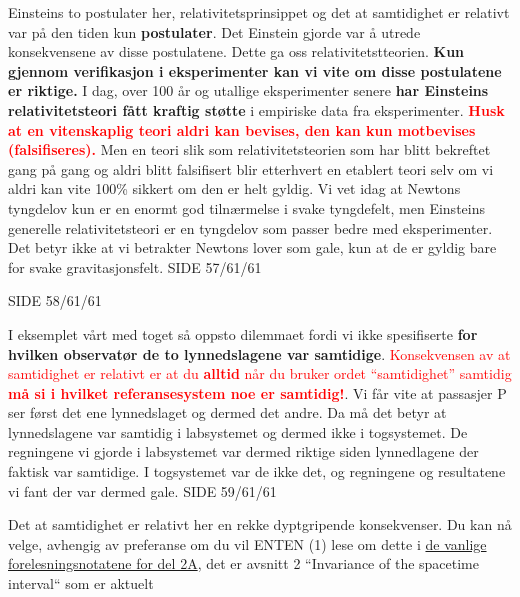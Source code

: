 \documentclass{beamer}
\let\hrefori\href
\renewcommand{\href}[2]{{\setlength{\fboxsep}{1pt}\colorbox{sunset}{\hrefori{#1}{#2}}}}
\begin{document}
\begin{frame}
{
  \large
Einsteins to postulater her, relativitetsprinsippet og det at samtidighet er relativt var på den tiden kun {\bf postulater}. Det Einstein gjorde var å utrede konsekvensene av disse postulatene. Dette ga oss relativitetstteorien. {\bf Kun gjennom verifikasjon i eksperimenter kan vi vite om disse postulatene er riktige.} I dag, over 100 år og utallige eksperimenter senere {\bf har Einsteins relativitetsteori fått kraftig støtte} i empiriske data fra eksperimenter. \textcolor{red}{\bf Husk at en vitenskaplig teori aldri kan bevises, den kan kun motbevises (falsifiseres).} Men en teori slik som relativitetsteorien som har blitt bekreftet gang på gang og aldri blitt falsifisert blir etterhvert en etablert teori selv om vi aldri kan vite 100\% sikkert om den er helt gyldig. Vi vet idag at Newtons tyngdelov kun er en enormt god tilnærmelse i svake tyngdefelt, men Einsteins generelle relativitetsteori er en tyngdelov som passer bedre med eksperimenter. Det betyr ikke at vi betrakter Newtons lover som gale, kun at de er gyldig bare for svake gravitasjonsfelt.
}{SIDE 57/61/61}


{
  \huge
{}
}{SIDE 58/61/61}

{
  \large
I eksemplet vårt med toget så oppsto dilemmaet fordi vi ikke spesifiserte {\bf for hvilken observatør de to lynnedslagene var samtidige}. \textcolor{red}{Konsekvensen av at samtidighet er relativt er at du {\bf alltid} når du bruker ordet ``samtidighet'' samtidig {\bf må si i hvilket referansesystem noe er samtidig!}}. Vi får vite at passasjer P ser først det ene lynnedslaget og dermed det andre. Da må det betyr at lynnedslagene var samtidig i labsystemet og dermed ikke i togsystemet. De regningene vi gjorde i labsystemet var dermed riktige siden lynnedlagene der faktisk var samtidige. I togsystemet var de ikke det, og regningene og resultatene vi fant der var dermed gale.
}{SIDE 59/61/61}


{
  \Large
Det at samtidighet er relativt her en rekke dyptgripende konsekvenser. Du kan nå velge, avhengig av preferanse om du vil ENTEN (1) lese om dette i \href{https://www.uio.no/studier/emner/matnat/astro/AST2000/h20/undervisningsmateriell/lecture_notes/part2a.pdf}{de vanlige forelesningsnotatene for del 2A}, det er avsnitt 2 ``Invariance of the spacetime interval`` som er aktuelt 

}
\end{frame}
\end{document}
